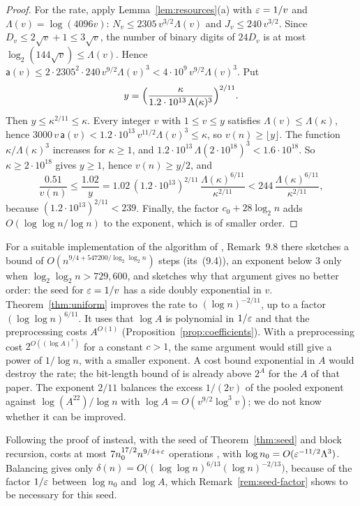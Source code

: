 \begin{proof}
For the rate, apply Lemma~\ref{lem:resources}(a) with \(\varepsilon=1/v\) and
\(\Lambda(v)=\log(4096v)\): \(N_v\le2305\,v^{3/2}\Lambda(v)\) and
\(J_v\le240\,v^{3/2}\). Since \(D_v\le2\sqrt v+1\le3\sqrt v\), the number of binary
digits of \(24D_v\) is at most \(\log_2(144\sqrt v)\le\Lambda(v)\). Hence
\(\mathsf a(v)\le2\cdot2305^2\cdot240\,v^{9/2}\Lambda(v)^3
<4\cdot10^9\,v^{9/2}\Lambda(v)^3\). Put
\[
 y=\Bigl(\frac{\kappa}{1.2\cdot10^{13}\,\Lambda(\kappa)^3}\Bigr)^{2/11}.
\]
Then \(y\le\kappa^{2/11}\le\kappa\). Every integer \(v\) with
\(1\le v\le y\) satisfies \(\Lambda(v)\le\Lambda(\kappa)\), hence
\(3000\,v\,\mathsf a(v)<1.2\cdot10^{13}\,v^{11/2}\Lambda(v)^3\le\kappa\),
so \(v(n)\ge\lfloor y\rfloor\). The function \(\kappa/\Lambda(\kappa)^3\)
increases for \(\kappa\ge1\), and
\(1.2\cdot10^{13}\,\Lambda(2\cdot10^{18})^3<1.6\cdot10^{18}\). So
\(\kappa\ge2\cdot10^{18}\) gives \(y\ge1\), hence \(v(n)\ge y/2\), and
\[
 \frac{0.51}{v(n)}\le\frac{1.02}y
 =1.02\,(1.2\cdot10^{13})^{2/11}\,\frac{\Lambda(\kappa)^{6/11}}{\kappa^{2/11}}
 <244\,\frac{\Lambda(\kappa)^{6/11}}{\kappa^{2/11}},
\]
because \((1.2\cdot10^{13})^{2/11}<239\). Finally, the factor
\(c_0+28\log_2n\) adds \(O(\log\log n/\log n)\) to the exponent, which is
of smaller order.
\end{proof}

\begin{remark}
\label{rem:uniform-comparison}
For a suitable implementation of the algorithm of
\citep[Corollary~9.7]{FinCon26}, Remark~9.8 there sketches a bound of
\(O(n^{9/4+547200/\log_2\log_2n})\) steps (its~(9.4)), an exponent below
\(3\) only when \(\log_2\log_2n>729{,}600\), and sketches why that
argument gives no better order: the seed for \(\varepsilon=1/v\) has a
side doubly exponential in \(v\). Theorem~\ref{thm:uniform} improves the
rate to \((\log n)^{-2/11}\), up to a factor \((\log\log n)^{6/11}\). It uses that
\(\log A\) is polynomial in \(1/\varepsilon\) and that the preprocessing costs
\(A^{O(1)}\) (Proposition~\ref{prop:coefficients}). With a preprocessing
cost \(2^{O((\log A)^c)}\) for a constant \(c>1\), the same argument would
still give a power of \(1/\log n\), with a smaller exponent. A cost
bound exponential in \(A\) would destroy the rate; the bit-length bound
of \citep[Theorem~9.3]{FinCon26} is already above \(2^A\) for the \(A\)
of that paper. The exponent \(2/11\) balances the excess
\(1/(2v)\) of the pooled exponent against \(\log(A^{22})/\log n\) with
\(\log A=O(v^{9/2}\log^3v)\); we do not know whether it can be improved.
\end{remark}

\begin{remark}\label{rem:seed-route}
Following the proof of \citep[Corollary~9.7]{FinCon26} instead, with the
seed of Theorem~\ref{thm:seed} and block recursion, costs at most
\(7n_0^{17/2}n^{9/4+\varepsilon}\) operations \citep[Lemma~9.4]{FinCon26}, with
\(\log n_0=O(\varepsilon^{-11/2}\Lambda^3)\). Balancing gives only
\(\delta(n)=O\bigl((\log\log n)^{6/13}(\log n)^{-2/13}\bigr)\), because of
the factor \(1/\varepsilon\) between \(\log n_0\) and \(\log A\), which
Remark~\ref{rem:seed-factor} shows to be necessary for this seed.
\end{remark}
